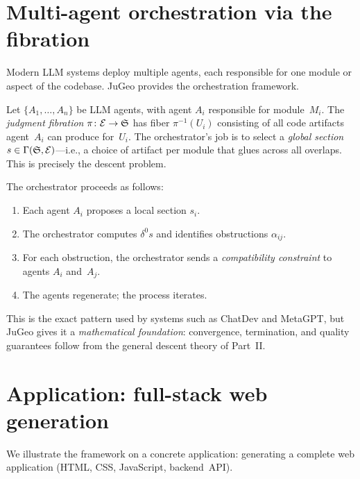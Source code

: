 \section{Multi-agent orchestration via the fibration}
\label{sec:multi-agent}

Modern LLM systems deploy multiple agents, each responsible for one
module or aspect of the codebase.  JuGeo provides the orchestration
framework.

\begin{construction}
\label{con:multi-agent}
Let $\{A_1, \dots, A_n\}$ be LLM agents, with agent $A_i$
responsible for module~$M_i$.  The \emph{judgment fibration}
$\pi\colon \mathcal{E} \to \mathfrak{S}$ has fiber $\pi^{-1}(U_i)$
consisting of all code artifacts agent~$A_i$ can produce for~$U_i$.
The orchestrator's job is to select a \emph{global section}
$s \in \Gamma(\mathfrak{S}, \mathcal{E})$---i.e., a choice of artifact per
module that glues across all overlaps.  This is precisely the
descent problem.
\end{construction}

The orchestrator proceeds as follows:
\begin{enumerate}
  \item Each agent $A_i$ proposes a local section $s_i$.
  \item The orchestrator computes $\delta^0 s$ and identifies
        obstructions $\alpha_{ij}$.
  \item For each obstruction, the orchestrator sends a
        \emph{compatibility constraint} to agents $A_i$ and~$A_j$.
  \item The agents regenerate; the process iterates.
\end{enumerate}

This is the exact pattern used by systems such as ChatDev and
MetaGPT, but JuGeo gives it a \emph{mathematical foundation}:
convergence, termination, and quality guarantees follow from the
general descent theory of Part~II.

\section{Application: full-stack web generation}
\label{sec:webapp-gen}

We illustrate the framework on a concrete application:
generating a complete web application (HTML, CSS, JavaScript,
backend~API).

